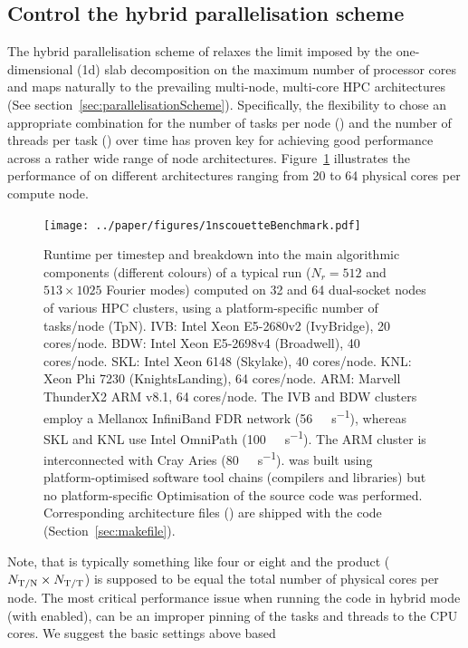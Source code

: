 \documentclass[a4paper, 11pt, DIV=11]{scrartcl}
\begin{document}
\subsection{Control the hybrid parallelisation scheme}
\label{sec:controlHybridScheme}
\color{red}
The hybrid parallelisation scheme of \nsc relaxes the limit imposed by the one-dimensional (1d)
slab decomposition on the maximum number of processor cores and maps naturally to the 
prevailing multi-node, multi-core HPC architectures (See
section~\ref{sec:parallelisationScheme}). Specifically, the flexibility to chose an appropriate
combination for the number of \mpi tasks per node (\tpn) and the number of \omp threads per 
\mpi task (\tpt) over time has proven key for achieving good performance across a rather wide 
range of node architectures. Figure~\ref{fig:runtime} illustrates the performance of \nsc 
on different architectures ranging from \num{20} to \num{64} physical cores per compute node.
\begin{figure}[htb]
\centering
\texttt{[image: ../paper/figures/1nscouetteBenchmark.pdf]}
\caption{Runtime per timestep and breakdown into the main algorithmic
components (different colours) of a typical \nsc run ($N_r=\num{512}$ and
$\num{513}\times\num{1025}$ Fourier modes) computed on \num{32} and \num{64}
dual-socket nodes of various HPC clusters, using a platform-specific number
of \mpi tasks/node (TpN).
IVB: Intel Xeon E5-2680v2 (IvyBridge), \num{20} cores/node.
BDW: Intel Xeon E5-2698v4 (Broadwell), \num{40} cores/node.
SKL: Intel Xeon 6148 (Skylake), \num{40} cores/node.
KNL: Xeon Phi 7230 (KnightsLanding), \num{64} cores/node.
ARM: Marvell ThunderX2 ARM v8.1, \num{64} cores/node.
The IVB and BDW clusters employ a Mellanox InfiniBand FDR network
(\SI{56}{\giga\bit\per\second}), whereas SKL and KNL use Intel OmniPath
(\SI{100}{\giga\bit\per\second}). The ARM cluster is interconnected
with Cray Aries (\SI{80}{\giga\bit\per\second}). \nsc was built using
platform-optimised software tool chains (\ie compilers and libraries)
but no platform-specific Optimisation of the source code was performed.
Corresponding architecture files () are shipped with
the code (Section~\ref{sec:makefile}).}
\label{fig:runtime}
\end{figure}
Note, that \tpn is typically something like four or eight and the product ($N_{\text{T/N}}\times N_{\text{T/T}}$) is
supposed to be equal the total number of physical cores per node. The most critical performance
issue when running the code in hybrid mode (\ie with \omp enabled), can be an improper pinning 
of the \mpi tasks and \omp threads to the CPU cores. We suggest the basic settings above based 
\end{document}
